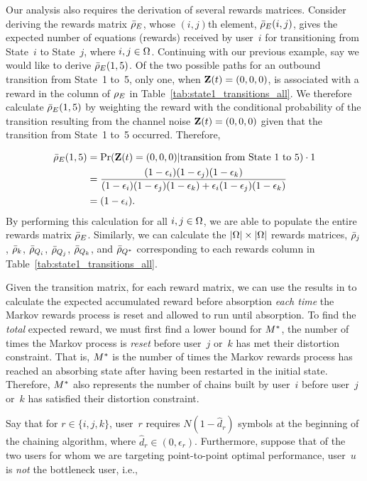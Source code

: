 Our analysis also requires the derivation of several rewards matrices.  Consider deriving the rewards matrix $\bar{\rho}_{E}$, whose $(i,j)$th element,  $\bar{\rho}_{E}(i, j)$, gives the expected number of equations (rewards) received by user~$i$ for transitioning from State~$i$ to State~$j$, where $i, j \in \Omega$.  Continuing with our previous example, say we would like to derive $\bar{\rho}_{E}(1, 5)$.  Of the two possible paths for an outbound transition from State~1 to~5, only one, when $\mathbf{Z}(t) = (0, 0, 0)$, is associated with a reward in the column of $\rho_{E}$ in Table~\ref{tab:state1_transitions_all}.  We therefore calculate $\bar{\rho}_{E}(1, 5)$ by weighting the reward with the conditional probability of the transition resulting from the channel noise $\mathbf{Z}(t) = (0, 0, 0)$ given that the transition from State~1 to~5 occurred.  Therefore,

\begin{align}
	\bar{\rho}_{E}(1, 5) &= \operatorname{Pr}(\mathbf{Z}(t) = (0, 0, 0) | \textrm{transition from State~1 to~5}) \cdot 1 \\
	&= \frac{(1 -\epsilon_i)(1 -\epsilon_j)(1 - \epsilon_k)}{(1 -\epsilon_i)(1 -\epsilon_j)(1 - \epsilon_k) + \epsilon_i(1 -\epsilon_j)(1 - \epsilon_k)} \\
	&= (1 -\epsilon_i).
\end{align}
By performing this calculation for all $i, j \in \Omega$, we are able to populate the entire rewards matrix $\bar{\rho}_{E}$.  Similarly, we can calculate the $|\Omega| \times |\Omega|$ rewards matrices, $\bar{\rho}_{j}$, $\bar{\rho}_{k}$, $\bar{\rho}_{Q_{i}}$, $\bar{\rho}_{Q_{j}}$, $\bar{\rho}_{Q_{k}}$, and $\bar{\rho}_{Q^{*}}$ corresponding to each rewards column in Table~\ref{tab:state1_transitions_all}.

Given the transition matrix, for each reward matrix, we can use the results in \cite[Corollary~\markovcor{}]{TMK_markov} to calculate the expected accumulated reward before absorption \emph{each time} the Markov rewards process is reset and allowed to run until absorption.  To find the \emph{total} expected reward, we must first find a lower bound for $M^{*}$, the number of times the Markov process is \emph{reset} before user~$j$ or~$k$ has met their distortion constraint.  That is, $M^{*}$ is the number of times the Markov rewards process has reached an absorbing state after having been restarted in the initial state.  Therefore, $M^{*}$ also represents the number of chains built by user~$i$ before user~$j$ or~$k$ has satisfied their distortion constraint.

Say that for $r \in \{i, j, k\}$, user~$r$ requires $N(1 - \hat{d}_r)$ symbols at the beginning of the chaining algorithm, where $\hat{d}_r \in (0, \epsilon_r)$.  Furthermore, suppose that of the two users for whom we are targeting point-to-point optimal performance, user~$u$ is \emph{not} the bottleneck user, i.e., 

